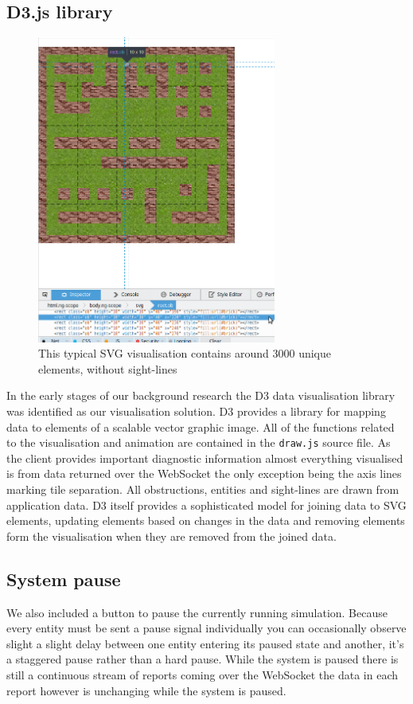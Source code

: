 \subsection{D3.js library}
\begin{figure}[h]
  \centering
  \includegraphics[width=0.7\textwidth]{img/svg-element.png}
\caption{This typical SVG visualisation contains around 3000 unique elements, without sight-lines}
    \label{fig:visualisation}
\end{figure}
In the early stages of our background research the D3 data visualisation library was identified as our visualisation solution. D3 provides a library for mapping data to elements of a scalable vector graphic image. All of the functions related to the visualisation and animation are contained in the \verb+draw.js+ source file. As the client provides important diagnostic information almost everything visualised is from data returned over the WebSocket the only exception being the axis lines marking tile separation. All obstructions, entities and sight-lines are drawn from application data.
D3 itself provides a sophisticated model for joining data to SVG elements, updating elements based on changes in the data and removing elements form the visualisation when they are removed from the joined data.
\subsection{System pause}
We also included a button to pause the currently running simulation. Because every entity must be sent a pause signal individually you can occasionally observe slight a slight delay between one entity entering its paused state and another, it's a staggered pause rather than a hard pause. While the system is paused there is still a continuous stream of reports coming over the WebSocket the data in each report however is unchanging while the system is paused.
